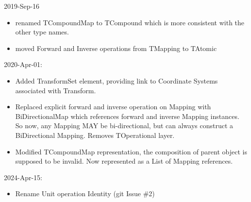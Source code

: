 \documentclass[11pt,a4paper]{ivoa}
\begin{document}
2019-Sep-16
\begin{itemize}
\item renamed TCompoundMap to TCompound which is more consistent with the other type names.
\item moved Forward and Inverse operations from TMapping to TAtomic
\end{itemize}
2020-Apr-01:
\begin{itemize}
\item Added TransformSet element, providing link to Coordinate Systems associated with Transform.
\item Replaced explicit forward and inverse operation on Mapping with BiDirectionalMap which references forward and inverse Mapping instances.  So now, any Mapping MAY be bi-directional, but can always construct a BiDirectional Mapping.  Removes TOperational layer.
\item Modified TCompoundMap representation, the composition of parent object is supposed to be invalid.  Now represented as a List of Mapping references.
\end{itemize}
2024-Apr-15:
\begin{itemize}
\item Rename Unit operation Identity (git Issue \#2)
\end{itemize}






\pagebreak

\end{document}
